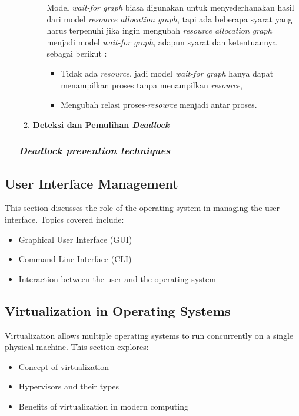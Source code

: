 \documentclass[12pt]{article}
\begin{document}
\begin{itemize}
\begin{enumerate}
\begin{enumerate}
                        \hspace{1cm}
                        Model \textit{wait-for graph} biasa digunakan untuk menyederhanakan hasil dari model \textit{resource allocation graph}, tapi ada beberapa syarat yang harus terpenuhi jika ingin mengubah \textit{resource allocation graph} menjadi model \textit{wait-for graph}, adapun syarat dan ketentuannya sebagai berikut : 
                        \begin{itemize}
                            \item Tidak ada \textit{resource}, jadi model \textit{wait-for graph} hanya dapat menampilkan proses tanpa menampilkan \textit{resource},
                            \item  Mengubah relasi proses-\textit{resource} menjadi antar proses.\newline
                        \end{itemize}

                        
                \end{enumerate}
            \item \textbf{Deteksi dan Pemulihan \textit{Deadlock}}
        \end{enumerate}
    \subsubsection{ \textit{Deadlock prevention techniques}}
\end{itemize}

\subsection{User Interface Management}
This section discusses the role of the operating system in managing the user interface. Topics covered include:
\begin{itemize}
    \item Graphical User Interface (GUI)
    \item Command-Line Interface (CLI)
    \item Interaction between the user and the operating system
\end{itemize}

\subsection{Virtualization in Operating Systems}
Virtualization allows multiple operating systems to run concurrently on a single physical machine. This section explores:
\begin{itemize}
    \item Concept of virtualization
    \item Hypervisors and their types
    \item Benefits of virtualization in modern computing
\end{itemize}
\end{document}
